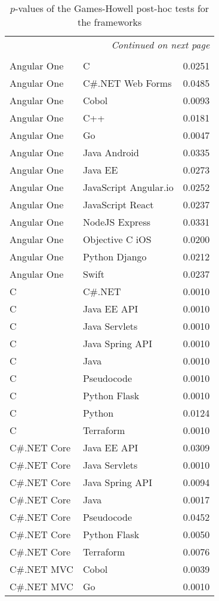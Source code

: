 {\footnotesize
\begin{longtable}{lll}
\caption[Games-Howell tests for frameworks]{$p$-values of the Games-Howell post-hoc tests for the frameworks}
\\
\endfirsthead
\multicolumn{3}{r}{\textit{Continued on next page}} \\
\endfoot
\\
\endlastfoot
Angular One & C & 0.0251\\
Angular One & C\#.NET Web Forms & 0.0485\\
Angular One & Cobol & 0.0093\\
Angular One & C++ & 0.0181\\
Angular One & Go & 0.0047\\
Angular One & Java Android & 0.0335\\
Angular One & Java EE & 0.0273\\
Angular One & JavaScript Angular.io & 0.0252\\
Angular One & JavaScript React & 0.0237\\
Angular One & NodeJS Express & 0.0331\\
Angular One & Objective C iOS & 0.0200\\
Angular One & Python Django & 0.0212\\
Angular One & Swift & 0.0237\\
C & C\#.NET & 0.0010\\
C & Java EE API & 0.0010\\
C & Java Servlets & 0.0010\\
C & Java Spring API & 0.0010\\
C & Java & 0.0010\\
C & Pseudocode & 0.0010\\
C & Python Flask & 0.0010\\
C & Python & 0.0124\\
C & Terraform & 0.0010\\
C\#.NET Core & Java EE API & 0.0309\\
C\#.NET Core & Java Servlets & 0.0010\\
C\#.NET Core & Java Spring API & 0.0094\\
C\#.NET Core & Java & 0.0017\\
C\#.NET Core & Pseudocode & 0.0452\\
C\#.NET Core & Python Flask & 0.0050\\
C\#.NET Core & Terraform & 0.0076\\
C\#.NET MVC & Cobol & 0.0039\\
C\#.NET MVC & Go & 0.0010\\

\end{longtable}}
